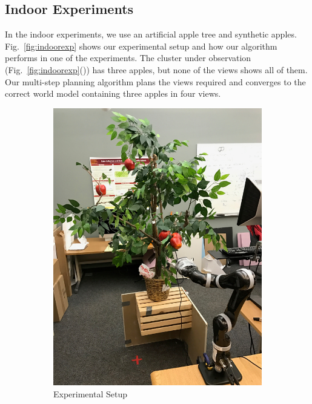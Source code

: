 \subsection{Indoor Experiments}\label{subsec:indoor}
In the indoor experiments, we use an artificial apple tree and synthetic apples. Fig.~\ref{fig:indoorexp} shows our experimental setup and how our algorithm performs in one of the experiments. The cluster under observation (Fig.~\ref{fig:indoorexp}()) has three apples, but none of the views shows all of them. Our multi-step planning algorithm plans the views required and converges to the correct world model containing three apples in four views.
\begin{figure}[!htbp]
\centering
\begin{subfigure}[b]{.32\textwidth}
    \includegraphics[width=\textwidth]{figures/active_counting/expsetup.jpeg}
\caption{Experimental Setup}
\label{fig:expsetup}
\end{subfigure}\quad \begin{subfigure}[b]{.58\textwidth}

\end{subfigure}
\end{figure}
